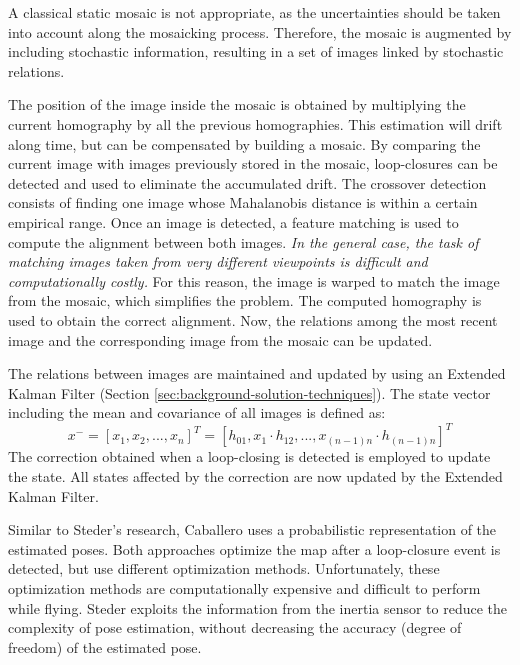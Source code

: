 A classical static mosaic is not appropriate, as the uncertainties should be taken into account along the mosaicking process.
Therefore, the mosaic is augmented by including stochastic information, resulting in a set of images linked by stochastic relations.

The position of the image inside the mosaic is obtained by multiplying the current homography by all the previous homographies.
This estimation will drift along time, but can be compensated by building a mosaic.
By comparing the current image with images previously stored in the mosaic, loop-closures can be detected and used to eliminate the accumulated drift.
The crossover detection consists of finding one image whose Mahalanobis distance is within a certain empirical range.
Once an image is detected, a feature matching is used to compute the alignment between both images. 
\textit{In the general case, the task of matching images taken from very different viewpoints is difficult and computationally costly.}
For this reason, the image is warped to match the image from the mosaic, which simplifies the problem.
The computed homography is used to obtain the correct alignment.
Now, the relations among the most recent image and the corresponding image from the mosaic can be updated.

The relations between images are maintained and updated by using an Extended Kalman Filter (Section \ref{sec:background-solution-techniques}).
The state vector including the mean and covariance of all images is defined as:
\begin{equation}
x^{-} = [x_1, x_2, ..., x_n]^T = [h_{01}, x_1 \cdot h_{12}, ..., x_{(n-1)n} \cdot h_{(n-1)n}]^T
\end{equation}
The correction obtained when a loop-closing is detected is employed to update the state.
All states affected by the correction are now updated by the Extended Kalman Filter.

Similar to Steder's research, Caballero uses a probabilistic representation of the estimated poses.
Both approaches optimize the map after a loop-closure event is detected, but use different optimization methods.
Unfortunately, these optimization methods are computationally expensive and difficult to perform while flying.
Steder exploits the information from the inertia sensor to reduce the complexity of pose estimation, without decreasing the accuracy (degree of freedom) of the estimated pose.




